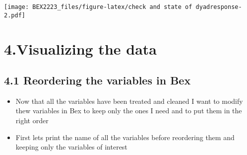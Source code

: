 \documentclass[
]{article}
\begin{document}
\texttt{[image: BEX2223\_files/figure-latex/check and state of dyadresponse-2.pdf]}

\hypertarget{visualizing-the-data}{%
\section{4.Visualizing the data}\label{visualizing-the-data}}

\hypertarget{reordering-the-variables-in-bex}{%
\subsection{4.1 Reordering the variables in
Bex}\label{reordering-the-variables-in-bex}}

\begin{itemize}
\item
  Now that all the variables have been treated and cleaned I want to
  modify thew variables in Bex to keep only the ones I need and to put
  them in the right order
\item
  First lets print the name of all the variables before reordering them
  and keeping only the variables of interest
\end{itemize}
\end{document}
